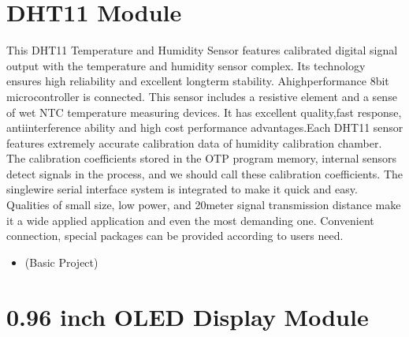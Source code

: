 \documentclass[a4paper,11pt,english]{sphinxmanual}
\let\sphinxpxdimen\pdfpxdimen\else\newdimen\sphinxpxdimen
\begin{document}
\section{DHT11 Module}
\label{\detokenize{Components_Kit/component_humiture_sensor:dht11-module}}\label{\detokenize{Components_Kit/component_humiture_sensor:cpn-dht11}}\label{\detokenize{Components_Kit/component_humiture_sensor::doc}}
\sphinxAtStartPar
This DHT11 Temperature and Humidity Sensor features calibrated digital signal output with the temperature and humidity sensor complex. Its technology ensures high reliability and excellent long\sphinxhyphen{}term stability. Ahigh\sphinxhyphen{}performance 8\sphinxhyphen{}bit microcontroller is connected. This sensor includes a resistive element and a sense of wet NTC temperature measuring devices. It has excellent quality,fast response, anti\sphinxhyphen{}interference ability and high cost performance advantages.Each DHT11 sensor features extremely accurate calibration data of humidity calibration chamber. The calibration coefficients stored in the OTP program memory, internal sensors detect signals in the process, and we should call these calibration coefficients. The single\sphinxhyphen{}wire serial interface system is integrated to make it quick and easy. Qualities of small size, low power, and 20\sphinxhyphen{}meter signal transmission distance make it a wide applied application and even the most demanding one. Convenient connection, special packages can be provided according to users need.

\noindent{\hspace*{\fill}\sphinxincludegraphics[width=200\sphinxpxdimen]{{dht11_pic}.png}\hspace*{\fill}}

\sphinxAtStartPar
{}
\begin{itemize}
\item {} 
\sphinxAtStartPar
{\hyperref[\detokenize{Basic_Project/DHT11_Module:basic-dht11-module}]{}} (Basic Project)

\end{itemize}

\sphinxstepscope


\section{0.96 inch OLED Display Module}
\label{\detokenize{Components_Kit/component_oled:inch-oled-display-module}}\label{\detokenize{Components_Kit/component_oled:cpn-oled}}\label{\detokenize{Components_Kit/component_oled::doc}}
\noindent{\hspace*{\fill}\sphinxincludegraphics[width=300\sphinxpxdimen]{{oled}.png}\hspace*{\fill}}
\end{document}
